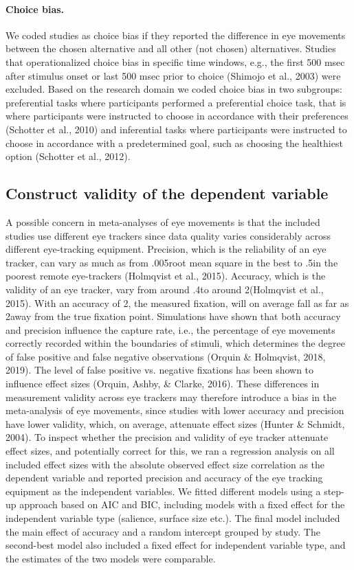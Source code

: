 \documentclass{article}
\begin{document}
\paragraph{Choice bias.} We coded studies as choice bias if they reported the difference in eye movements between the chosen alternative and all other (not chosen) alternatives. Studies that operationalized choice bias in specific time windows, e.g., the first 500 msec after stimulus onset or last 500 msec prior to choice (Shimojo et al., 2003) were excluded. Based on the research domain we coded choice bias in two subgroups: preferential tasks where participants performed a preferential choice task, that is where participants were instructed to choose in accordance with their preferences (Schotter et al., 2010) and inferential tasks where participants were instructed to choose in accordance with a predetermined goal, such as choosing the healthiest option (Schotter et al., 2012).


\subsection{Construct validity of the dependent variable}

A possible concern in meta-analyses of eye movements is that the included studies use different eye trackers since data quality varies considerably across different eye-tracking equipment. Precision, which is the reliability of an eye tracker, can vary as much as from .005\degree root mean square in the best to .5\degree in the poorest remote eye-trackers (Holmqvist et al., 2015). Accuracy, which is the validity of an eye tracker, vary from around .4\degree to around 2\degree (Holmqvist et al., 2015). With an accuracy of 2\degree, the measured fixation, will on average fall as far as 2\degree away from the true fixation point. Simulations have shown that both accuracy and precision influence the capture rate, i.e., the percentage of eye movements correctly recorded within the boundaries of stimuli, which determines the degree of false positive and false negative observations (Orquin \& Holmqvist, 2018, 2019). The level of false positive vs. negative fixations has been shown to influence effect sizes (Orquin, Ashby, \& Clarke, 2016). These differences in measurement validity across eye trackers may therefore introduce a bias in the meta-analysis of eye movements, since studies with lower accuracy and precision have lower validity, which, on average, attenuate effect sizes (Hunter \& Schmidt, 2004). To inspect whether the precision and validity of eye tracker attenuate effect sizes, and potentially correct for this, we ran a regression analysis on all included effect sizes with the absolute observed effect size correlation as the dependent variable and reported precision and accuracy of the eye tracking equipment as the independent variables. We fitted different models using a step-up approach based on AIC and BIC, including models with a fixed effect for the independent variable type (salience, surface size etc.). The final model included the main effect of accuracy and a random intercept grouped by study. The second-best model also included a fixed effect for independent variable type, and the estimates of the two models were comparable.
\end{document}
